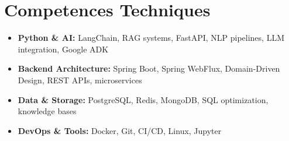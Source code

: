 \documentclass[a4paper,11pt]{article}
\begin{document}
\section{Competences Techniques}
\begin{itemize}[leftmargin=*, nosep]
    \item \small{\textbf{Python \& AI:} LangChain, RAG systems, FastAPI, NLP pipelines, LLM integration, Google ADK}
    \item \small{\textbf{Backend Architecture:} Spring Boot, Spring WebFlux, Domain-Driven Design, REST APIs, microservices}
    \item \small{\textbf{Data \& Storage:} PostgreSQL, Redis, MongoDB, SQL optimization, knowledge bases}
    \item \small{\textbf{DevOps \& Tools:} Docker, Git, CI/CD, Linux, Jupyter}
\end{itemize}
\end{document}
